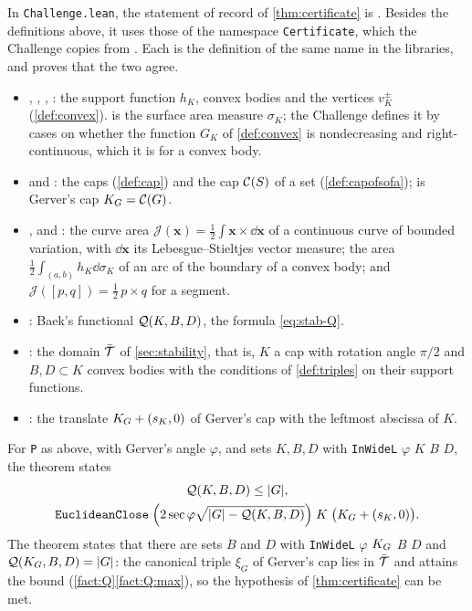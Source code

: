In \texttt{Challenge.lean}, the statement of record of
\cref{thm:certificate} is . Besides the
definitions above, it uses those of the namespace \texttt{Certificate}, which
the Challenge copies from . Each
is the definition of the same name in the libraries, and
 proves that the two agree.
\begin{itemize}
\item {}, , , : the support
function $h_K$, convex bodies and the vertices $v_K^\pm$
(\cref{def:convex}).  is the surface area measure $\sigma_K$; the
Challenge defines it by cases on whether the function $G_K$ of
\cref{def:convex} is nondecreasing and right-continuous, which it is for a
convex body.
\item {} and : the caps (\cref{def:cap}) and the cap
$\mathcal{C}(S)$ of a set (\cref{def:capofsofa});  is Gerver's cap
$K_G=\mathcal{C}(G)$.
\item {},  and : the curve
area $\mathcal J(\mathbf x)=\frac12\int\mathbf x\times\dd\mathbf x$ of a
continuous curve of bounded variation, with $\dd\mathbf x$ its
Lebesgue--Stieltjes vector measure; the area
$\frac12\int_{(a,b)}h_K\dd\sigma_K$ of an arc of the boundary of a convex body;
and $\mathcal J([p,q])=\frac12\,p\times q$ for a segment.
\item {}: Baek's functional $\mathcal{Q}(K,B,D)$, the formula
\eqref{eq:stab-Q}.
\item {}: the domain $\bar{\mathcal{T}}$ of \cref{sec:stability}, that is,
$K$ a cap with rotation angle $\pi/2$ and $B,D\subset K$ convex bodies with the
conditions of \cref{def:triples} on their support functions.
\item {}: the translate $K_G+(s_K,0)$ of Gerver's cap
with the leftmost abscissa of $K$.
\end{itemize}
For \texttt{P} as above, with Gerver's angle $\varphi$, and sets $K,B,D$ with
\texttt{InWideL} $\varphi$ $K$ $B$ $D$, the theorem states
\begin{gather*}
  \mathcal{Q}(K,B,D)\le\lvert G\rvert,\\
  \texttt{EuclideanClose}\;\Bigl(2\sec\varphi\sqrt{\lvert G\rvert-\mathcal{Q}(K,B,D)}\Bigr)\;
  K\;\bigl(K_G+(s_K,0)\bigr).
\end{gather*}
The theorem  states that there are sets $B$
and $D$ with \texttt{InWideL} $\varphi$ $K_G$ $B$ $D$ and
$\mathcal{Q}(K_G,B,D)=\lvert G\rvert$: the canonical triple $\xi_G$ of Gerver's cap lies in
$\bar{\mathcal{T}}$ and attains the bound (\cref{fact:Q}\ref{fact:Q:max}), so the
hypothesis of \cref{thm:certificate} can be met.

